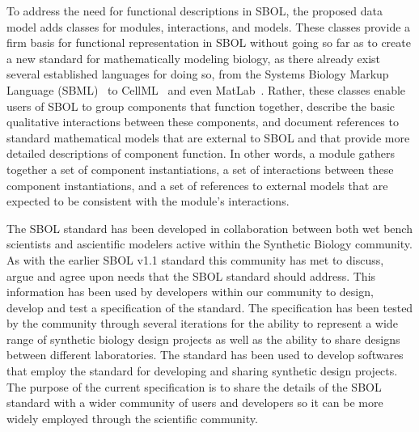 To address the need for functional descriptions in SBOL, the proposed data model adds classes for modules, interactions, and models. These classes provide a firm basis for functional representation in SBOL without going so far as to create a new standard for mathematically modeling biology, as there already exist several established languages for doing so, from the Systems Biology Markup Language (SBML)~\cite{SBML} to CellML~\cite{CellML} and even MatLab~\cite{matlab}. Rather, these classes enable users of SBOL to group components that function together, describe the basic qualitative interactions between these components, and document references to standard mathematical models that are external to SBOL and that provide more detailed descriptions of component function. In other words, a module gathers together a set of component instantiations, a set of interactions between these component instantiations, and a set of references to external models that are expected to be consistent with the module's interactions.

The SBOL standard has been developed in collaboration between both wet bench scientists and ascientific modelers active within the Synthetic Biology community. As with the earlier SBOL v1.1 standard this community has met to discuss, argue and agree upon needs that the SBOL standard should address. This information has been used by developers within our community to design, develop and test a specification of the standard. The specification has been tested by the community through several iterations for the ability to represent a wide range of synthetic biology design projects as well as the ability to share designs between different laboratories. The standard has been used to develop softwares that employ the standard for developing and sharing synthetic design projects. The purpose of the current specification is to share the details of the SBOL standard with a wider community of users and developers so it can be more widely employed through the scientific community.

